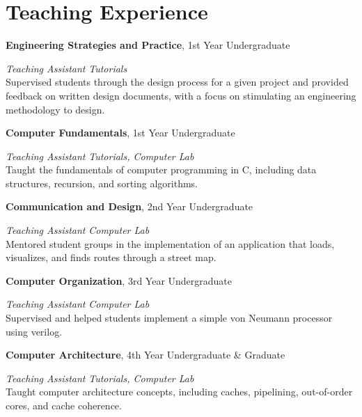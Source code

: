 \section{\sc Teaching Experience}

{\bf Engineering Strategies and Practice}, 1st Year Undergraduate
\vspace{-.3cm}

{\em Teaching Assistant} \hfill {\em Tutorials}\\
Supervised students through the design process for a given project and provided feedback on written design documents, 
with a focus on stimulating an engineering methodology to design.

{\bf Computer Fundamentals}, 1st Year Undergraduate
\vspace{-.3cm}

{\em Teaching Assistant} \hfill {\em Tutorials, Computer Lab}\\
Taught the fundamentals of computer programming in C, including data structures, recursion, and sorting algorithms.

{\bf Communication and Design}, 2nd Year Undergraduate
\vspace{-.3cm}

{\em Teaching Assistant} \hfill {\em Computer Lab}\\
Mentored student groups in the implementation of an application that loads, visualizes, and finds routes through a
street map.

{\bf Computer Organization}, 3rd Year Undergraduate
\vspace{-.3cm}

{\em Teaching Assistant} \hfill {\em Computer Lab}\\
Supervised and helped students implement a simple von Neumann processor using verilog.

{\bf Computer Architecture}, 4th Year Undergraduate \& Graduate
\vspace{-.3cm}

{\em Teaching Assistant} \hfill {\em Tutorials, Computer Lab}\\
Taught computer architecture concepts, including caches, pipelining, out-of-order cores, and cache coherence.

